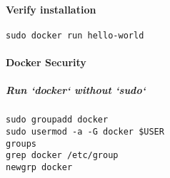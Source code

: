 \paragraph{Verify installation}

\begin{verbatim}
sudo docker run hello-world
\end{verbatim}

\paragraph{Docker Security}

\subparagraph{Run `docker` without `sudo`}

\begin{verbatim}
sudo groupadd docker
sudo usermod -a -G docker $USER
groups
grep docker /etc/group
newgrp docker
\end{verbatim}